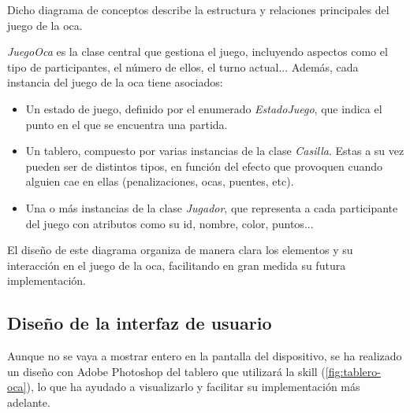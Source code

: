 Dicho diagrama de conceptos describe la estructura y relaciones principales del juego de la oca. 

\textit{JuegoOca} es la clase central que gestiona el juego, incluyendo aspectos como el tipo de participantes, el número de ellos, el turno actual... Además, cada instancia del juego de la oca tiene asociados:
\begin{itemize}
	\item Un estado de juego, definido por el enumerado \textit{EstadoJuego}, que indica el punto en el que se encuentra una partida.
	\item Un tablero, compuesto por varias instancias de la clase \textit{Casilla}. Estas a su vez pueden ser de distintos tipos, en función del efecto que provoquen cuando alguien cae en ellas (penalizaciones, ocas, puentes, etc).
	\item Una o más instancias de la clase \textit{Jugador}, que representa a cada participante del juego con atributos como su id, nombre, color, puntos...
\end{itemize}

El diseño de este diagrama organiza de manera clara los elementos y su interacción en el juego de la oca, facilitando en gran medida su futura implementación.

\newpage 

\subsection{Diseño de la interfaz de usuario}

Aunque no se vaya a mostrar entero en la pantalla del dispositivo, se ha realizado un diseño con Adobe Photoshop del tablero que utilizará la skill (\autoref{fig:tablero-oca}), lo que ha ayudado a visualizarlo y facilitar su implementación más adelante.


